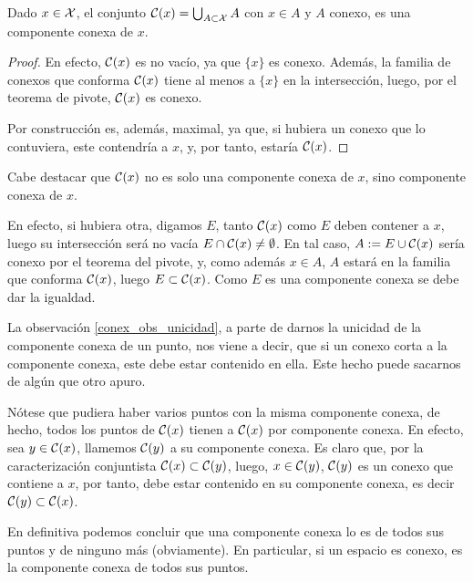 \begin{lem}
	Dado $x\in\mathcal{X}$, el conjunto 
	$\mathcal{C}(x)=\bigcup_{A\subset\mathcal{X}} A$ con $x\in A$ y $A$ conexo, es una componente conexa de $x$.
\end{lem}
\begin{proof}
	En efecto, $\mathcal{C}(x)$ es no vacío, ya que $\{x\}$ es conexo. Además, la familia de conexos que conforma $\mathcal{C}(x)$ tiene al menos a $\{x\}$ en la intersección, luego, por el teorema de pivote, $\mathcal{C}(x)$ es conexo.
	
	Por construcción es, además, maximal, ya que, si hubiera un conexo que lo contuviera, este contendría a $x$, y, por tanto, estaría $\mathcal{C}(x)$.
\end{proof}
\begin{obs}[Unicidad]
	\label{conex_obs_unicidad}
	Cabe destacar que $\mathcal{C}(x)$ no es solo una componente conexa de $x$, sino  componente conexa de $x$. 
	
	En efecto, si hubiera otra, digamos $E$, tanto $\mathcal{C}(x)$ como $E$ deben contener a $x$, luego su intersección será no vacía $E\cap \mathcal{C}(x)\not=\emptyset$. En tal caso, $A:=E\cup \mathcal{C}(x)$ sería conexo por el teorema del pivote, y, como además $x\in A$, $A$ estará en la familia que conforma $\mathcal{C}(x)$, luego $E\subset\mathcal{C}(x)$. Como $E$ es una componente conexa se debe dar la igualdad.
\end{obs}
\begin{obs}
	\label{conex_obs_inter}
	La observación \ref{conex_obs_unicidad}, a parte de darnos la unicidad de la componente conexa de un punto, nos viene a decir, que si un conexo corta a la componente conexa, este debe estar contenido en ella. Este hecho puede sacarnos de algún que otro apuro. 
\end{obs}
\begin{obs}
	\label{conex_obs_compartido}
	Nótese que pudiera haber varios puntos con la misma componente conexa, de hecho, todos los puntos de $\mathcal{C}(x)$ tienen a $\mathcal{C}(x)$ por componente conexa. En efecto, sea $y\in\mathcal{C}(x)$, llamemos $\mathcal{C}(y)$ a su componente conexa. Es claro que, por la caracterización conjuntista $\mathcal{C}(x)\subset\mathcal{C}(y)$, luego, $x\in\mathcal{C}(y)$, $\mathcal{C}(y)$ es un conexo que contiene a $x$, por tanto, debe estar contenido en su componente conexa, es decir $\mathcal{C}(y)\subset\mathcal{C}(x)$.
	
	En definitiva podemos concluir que una componente conexa lo es de todos sus puntos y de ninguno más (obviamente). En particular, si un espacio es conexo, es la componente conexa de todos sus puntos.
\end{obs}

